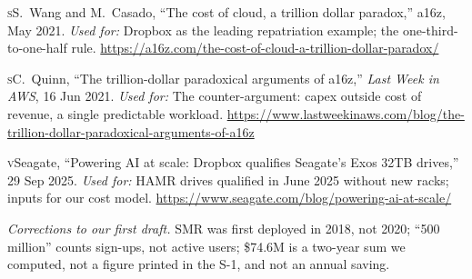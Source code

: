 \documentclass[a4paper,justified,nobib]{tufte-handout}
\begin{document}
\begin{fullwidth}
\begin{list}{}{\setlength{\leftmargin}{2.2em}\setlength{\labelwidth}{1.8em}\setlength{\labelsep}{0.4em}\setlength{\itemsep}{1.5pt}\setlength{\parsep}{0pt}}
\item[{[14]}] {\scshape\MakeLowercase{S}}\enspace S.~Wang and M.~Casado, ``The cost of cloud, a trillion dollar paradox,'' a16z, May 2021. \textit{Used for:} Dropbox as the leading repatriation example; the one-third-to-one-half rule. \url{https://a16z.com/the-cost-of-cloud-a-trillion-dollar-paradox/}
\item[{[15]}] {\scshape\MakeLowercase{S}}\enspace C.~Quinn, ``The trillion-dollar paradoxical arguments of a16z,'' \textit{Last Week in AWS}, 16 Jun 2021. \textit{Used for:} The counter-argument: capex outside cost of revenue, a single predictable workload. \url{https://www.lastweekinaws.com/blog/the-trillion-dollar-paradoxical-arguments-of-a16z}
\item[{[16]}] {\scshape\MakeLowercase{V}}\enspace Seagate, ``Powering AI at scale: Dropbox qualifies Seagate's Exos 32TB drives,'' 29 Sep 2025. \textit{Used for:} HAMR drives qualified in June 2025 without new racks; inputs for our cost model. \url{https://www.seagate.com/blog/powering-ai-at-scale/}
\end{list}

\vspace{2mm}
\noindent\textit{Corrections to our first draft.} SMR was first deployed in 2018, not 2020;
``500 million'' counts sign-ups, not active users; \$74.6M is a two-year sum we computed, not
a figure printed in the S-1, and not an annual saving.


\end{fullwidth}
\end{document}
